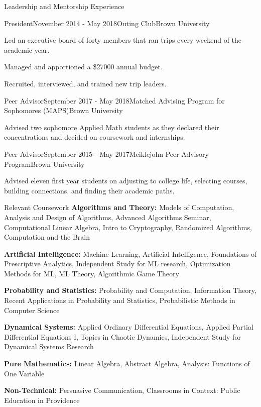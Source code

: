 \documentclass{cv} %
\begin{document}
\begin{rSection}{Leadership and Mentorship Experience}
\begin{rSubsection}{President}{November 2014 - May 2018}{Outing Club}{Brown University}
\item Led an executive board of forty members that ran trips every weekend of the academic year.
\item Managed and apportioned a \$27000 annual budget.
\item Recruited, interviewed, and trained new trip leaders.
\end{rSubsection}

\begin{rSubsection}{Peer Advisor}{September 2017 - May 2018}{Matched Advising Program for Sophomores (MAPS)}{Brown University}
\item Advised two sophomore Applied Math students as they declared their concentrations and decided on coursework and internships.
\end{rSubsection}

\begin{rSubsection}{Peer Advisor}{September 2015 - May 2017}{Meiklejohn Peer Advisory Program}{Brown University}
\item Advised eleven first year students on adjusting to college life, selecting courses, building connections, and finding their academic paths.
\end{rSubsection}

\end{rSection}


\begin{rSection}{Relevant Coursework}
\textbf{Algorithms and Theory:} Models of Computation, Analysis and Design of Algorithms, Advanced Algorithms Seminar, Computational Linear Algebra, Intro to Cryptography, Randomized Algorithms, Computation and the Brain

\textbf{Artificial Intelligence:} Machine Learning, Artificial Intelligence, Foundations of Prescriptive Analytics, Independent Study for ML research, Optimization Methods for ML, ML Theory, Algorithmic Game Theory

\textbf{Probability and Statistics:} Probability and Computation, Information Theory, Recent Applications in Probability and Statistics, Probabilistic Methods in Computer Science

\textbf{Dynamical Systems:} Applied Ordinary Differential Equations, Applied Partial Differential Equations I, Topics in Chaotic Dynamics, Independent Study for Dynamical Systems Research

\textbf{Pure Mathematics:} Linear Algebra, Abstract Algebra, Analysis: Functions of One Variable

\textbf{Non-Technical:} Persuasive Communication, Classrooms in Context: Public Education in Providence

\end{rSection}
\end{document}
